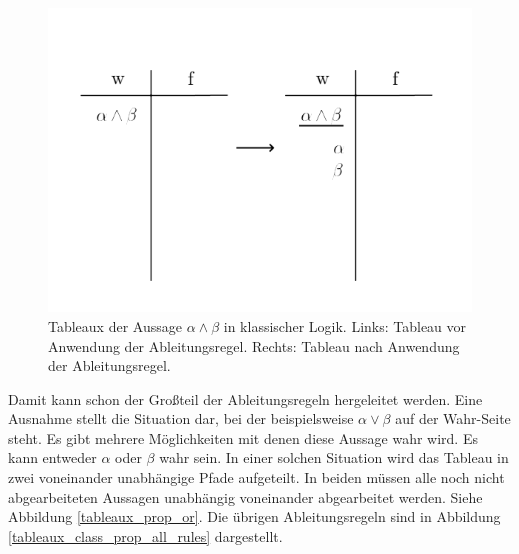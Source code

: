 \begin{figure}[h]
\begin{center}
\includegraphics[scale=0.7]{images/Tableaux_And_Prop_Logic.png}
\caption{Tableaux der Aussage $\alpha\wedge\beta$ in klassischer Logik. Links: Tableau vor Anwendung der Ableitungsregel. Rechts: Tableau nach Anwendung der Ableitungsregel.}
\label{tableaux_prop_and}
\end{center}
\end{figure}

Damit kann schon der Großteil der Ableitungsregeln hergeleitet werden. Eine Ausnahme stellt die Situation dar, bei der beispielsweise $\alpha\vee\beta$ auf der Wahr-Seite steht. Es gibt mehrere Möglichkeiten mit denen diese Aussage wahr wird. Es kann entweder $\alpha$ oder $\beta$ wahr sein. In einer solchen Situation wird das Tableau in zwei voneinander unabhängige Pfade aufgeteilt. In beiden müssen alle noch nicht abgearbeiteten Aussagen unabhängig voneinander abgearbeitet werden. Siehe Abbildung \ref{tableaux_prop_or}. Die übrigen Ableitungsregeln sind in Abbildung \ref{tableaux_class_prop_all_rules} dargestellt.

